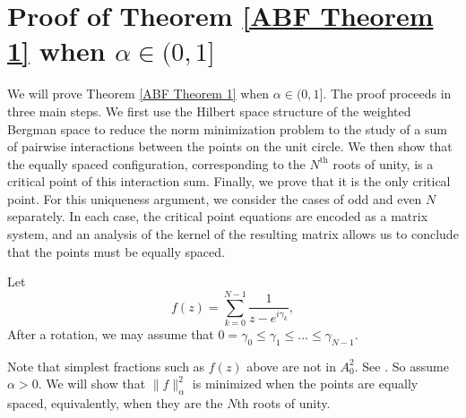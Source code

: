 \documentclass{article}
\begin{document}
\section{Proof of Theorem \ref{ABF Theorem 1} when $\alpha\in (0,1]$}



We will prove Theorem \ref{ABF Theorem 1} when $\alpha\in (0,1]$. The proof proceeds in three main steps. We first use the Hilbert space structure of the weighted Bergman space to reduce the norm minimization problem to the study of a sum of pairwise interactions between the points on the unit circle. We then show that the equally spaced configuration, corresponding to the $N^{\text{th}}$ roots of unity, is a critical point of this interaction sum. Finally, we prove that it is the only critical point. For this uniqueness argument, we consider the cases of odd and even $N$ separately. In each case, the critical point equations are encoded as a matrix system, and an analysis of the kernel of the resulting matrix allows us to conclude that the points must be equally spaced.

Let
$$f(z) = \sum_{k=0}^{N-1} \frac{1}{z - e^{i\gamma_k}},$$
After a rotation, we may assume that $0=\gamma_0\leq\gamma_1\leq\dots\leq\gamma_{N-1}$.

Note that simplest fractions such as $f(z)$ above are not in $A^2_0$. See \cite{ABF2021}. So assume $\alpha > 0$. We will show that $\|f\|_\alpha^2$ is minimized when the points are equally spaced, equivalently, when they are the $N$th roots of unity.
\end{document}
